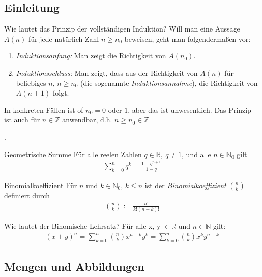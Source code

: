 \subsection{Einleitung}
\begin{karte}{Wie lautet das Prinzip der vollständigen Induktion?}
	Will man eine Aussage \(A(n)\) für jede natürlich Zahl \(n\geq n_{0}\)  beweisen, geht man folgendermaßen vor:
	\begin{enumerate}[label= (\roman*)]
		\item \emph{Induktionsanfang:} Man zeigt die Richtigkeit von \(A(n_{0})\).
		\item \emph{Induktionsschluss:} Man zeigt, dass aus der Richtigkeit von \(A(n)\) für beliebiges \(n\), \(n\geq n_{0}\) (die sogenannte \emph{Induktionsannahme}), die Richtigkeit von \(A(n+1)\) folgt.
	\end{enumerate}
	In konkreten Fällen ist of \(n_{0}=0\) oder \(1\), aber das ist unwesentlich. Das Prinzip ist auch für \(n\in\mathbb{Z}\) anwendbar, d.h. \(n \geq n_{0}\in\mathbb{Z}\)
\end{karte}.

\begin{karte}{Geometrische Summe}
	Für alle reelen Zahlen \(q \in \mathbb{R},\ q\neq1\), und alle \(n \in \mathbb{N}_0\) gilt
	\begin{align}
		\sum_{k=0}^{n} q^k = \frac{1-q^{n+1}}{1-q}
	\end{align}
\end{karte}

\begin{karte}{Binomialkoeffizient}
	Für \(n\) und \(k \in \mathbb{N}_0\), \( k \leq n\) ist der \emph{Binomialkoeffizient} \(\binom{n}{k}\) definiert durch
	\begin{align}
		\binom{n}{k} := \frac{n!}{k!(n-k)!}
	\end{align}
\end{karte}

\begin{karte}{Wie lautet der Binomische Lehrsatz?}
	Für alle x, y \(\in \mathbb{R}\) und \(n \in \mathbb{N}\) gilt:
	\begin{align}
		{(x + y)}^n = \sum_{k=0}^{n}\binom{n}{k} x^{n-k}y^k=\sum_{k=0}^{n}\binom{n}{k} x^{k}y^{n-k}
	\end{align}
\end{karte}

\subsection{Mengen und Abbildungen}


